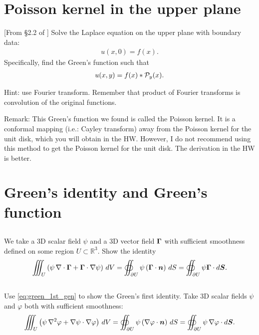 \documentclass[11pt,letterpaper]{article}
\begin{document}
\section{Poisson kernel in the upper plane}
[From \S2.2 of \cite{SteinShakarchi_03}] Solve the Laplace equation on the upper plane with boundary data:
\begin{align}
    u(x,0) = f(x).
\end{align}
Specifically, find the Green's function such that
\begin{align}
    u(x,y) = f(x)*\mathcal{P}_y(x).
\end{align}

Hint: use Fourier transform. Remember that product of Fourier transforms is convolution of the original functions. 

Remark: This Green's function we found is called the Poisson kernel. It is a conformal mapping (i.e.: Cayley transform) away from the Poisson kernel for the unit disk, which you will obtain in the HW. However, I do not recommend using this method to get the Poisson kernel for the unit disk. The derivation in the HW is better.

\section{Green's identity and Green's function}
\subsection{}
We take a 3D scalar field $\psi$ and a 3D vector field $\boldsymbol{\Gamma}$ with sufficient smoothness defined on some region $U \subset \mathbb{R}^3$. Show the identity
\begin{align}
    \iiint_U \left( \psi \, \nabla \cdot \boldsymbol{\Gamma} + \boldsymbol{\Gamma} \cdot \nabla \psi\right)\, dV  = \oiint_{\partial U} \psi \left( \boldsymbol{\Gamma} \cdot \boldsymbol{n} \right)\, dS=\oiint_{\partial U}\psi\boldsymbol{\Gamma}\cdot d\boldsymbol{S}.\label{eq:green_1st_gen}
\end{align}

\subsection{}
Use \eqref{eq:green_1st_gen} to show the Green's first identity. Take 3D scalar fields $\psi$ and $\varphi$ both with sufficient smoothness:
\begin{align}
    \iiint_U \left( \psi \, \nabla^2 \varphi + \nabla \psi \cdot \nabla \varphi \right)\, dV  = \oiint_{\partial U} \psi \left( \nabla \varphi \cdot \boldsymbol{n} \right)\, dS=\oiint_{\partial U}\psi\,\nabla\varphi\cdot d\boldsymbol{S}.
\end{align}
\end{document}
